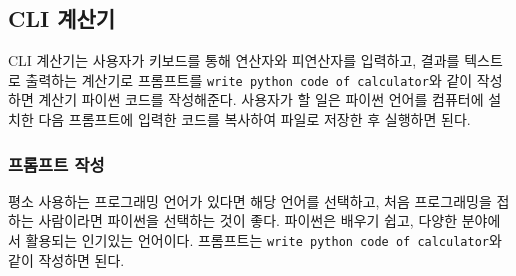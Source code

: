 \documentclass[
  letterpaper,
]{book}
\begin{document}
\hypertarget{cli-uxacc4uxc0b0uxae30}{%
\subsection{CLI 계산기}\label{cli-uxacc4uxc0b0uxae30}}

CLI 계산기는 사용자가 키보드를 통해 연산자와 피연산자를 입력하고, 결과를
텍스트로 출력하는 계산기로 프롬프트를
\texttt{write\ python\ code\ of\ calculator}와 같이 작성하면 계산기
파이썬 코드를 작성해준다. 사용자가 할 일은 파이썬 언어를 컴퓨터에 설치한
다음 프롬프트에 입력한 코드를 복사하여 파일로 저장한 후 실행하면 된다.

\hypertarget{uxd504uxb86cuxd504uxd2b8-uxc791uxc131}{%
\subsubsection{프롬프트
작성}\label{uxd504uxb86cuxd504uxd2b8-uxc791uxc131}}

평소 사용하는 프로그래밍 언어가 있다면 해당 언어를 선택하고, 처음
프로그래밍을 접하는 사람이라면 파이썬을 선택하는 것이 좋다. 파이썬은
배우기 쉽고, 다양한 분야에서 활용되는 인기있는 언어이다. 프롬프트는
\texttt{write\ python\ code\ of\ calculator}와 같이 작성하면 된다.
\end{document}
